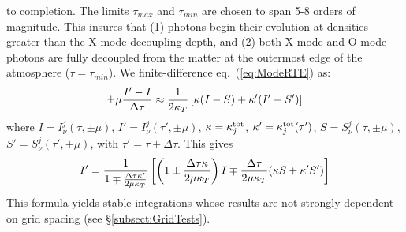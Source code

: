 \documentclass[useAMS,onecolumn,usenatbib,usegraphicx]{mn2e}
\begin{document}
to completion.
The limits $\tau_{max}$ and $\tau_{min}$ are chosen to span 5-8 orders of magnitude.  This insures 
that (1)
photons begin their evolution at densities greater than the X-mode decoupling depth, 
and (2) both 
X-mode and O-mode photons are fully decoupled from the matter at the outermost edge of the atmosphere ($\tau=\tau_{min}$).
We finite-difference eq.~(\ref{eq:ModeRTE}) as:
\begin{eqnarray}
\pm\mu {I'-I\over\Delta\tau}\approx {1\over 2\kappa_T}\left[\kappa(I-S)+\kappa'(I'-S')\right]
\end{eqnarray}
where $I=I_{\nu}^j(\tau,\pm\mu)$, $I'=I_{\nu}^j(\tau',\pm\mu)$, $\kappa=\kappa_j^{\rm tot}$, 
$\kappa'=\kappa_j^{\rm tot}(\tau')$, $S=S_{\nu}^j(\tau,\pm\mu)$, $S'=S_{\nu}^j(\tau',\pm\mu)$,
with $\tau'=\tau+\Delta\tau$.  This gives
\begin{eqnarray}
\label{eq:FinDiff}
I'={1\over 1\mp{\Delta\tau\kappa'\over 2\mu\kappa_T}}\left[\left(1\pm{\Delta\tau\kappa\over 2\mu\kappa_T}\right)I\mp 
{\Delta\tau \over 2\mu\kappa_T}(\kappa S+\kappa'S')\right]
\end{eqnarray}
This formula yields stable integrations whose results are not strongly dependent on grid spacing 
(see \S\ref{subsect:GridTests}).
\end{document}
